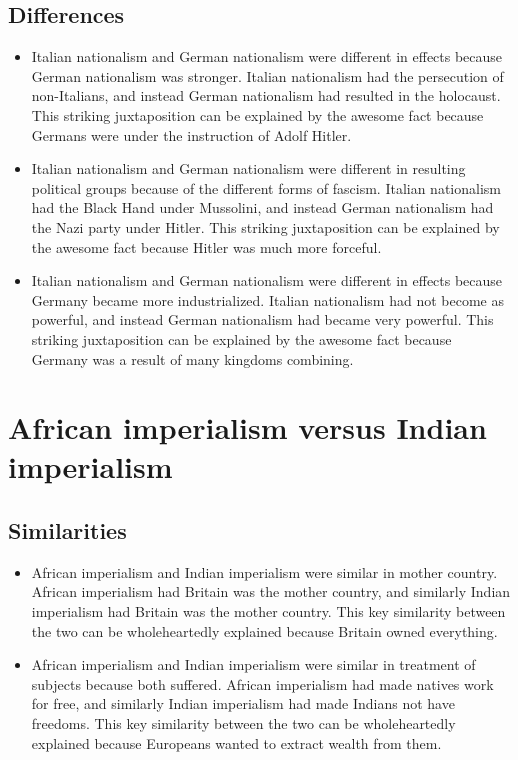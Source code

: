 \documentclass[letterpaper, 10pt]{article}
\begin{document}
            \subsection{Differences}
                \begin{itemize}
                    \item Italian nationalism and German nationalism were different in effects because German nationalism was stronger. Italian nationalism had the persecution of non-Italians, and instead German nationalism had resulted in the holocaust. This striking juxtaposition can be explained by the awesome fact because Germans were under the instruction of Adolf Hitler.
                    \item Italian nationalism and German nationalism were different in resulting political groups because of the different forms of fascism. Italian nationalism had the Black Hand under Mussolini, and instead German nationalism had the Nazi party under Hitler. This striking juxtaposition can be explained by the awesome fact because Hitler was much more forceful.
                    \item Italian nationalism and German nationalism were different in effects because Germany became more industrialized. Italian nationalism had not become as powerful, and instead German nationalism had became very powerful. This striking juxtaposition can be explained by the awesome fact because Germany was a result of many kingdoms combining.
                \end{itemize}
        \section{African imperialism versus Indian imperialism}
            \subsection{Similarities}
                \begin{itemize}
                    \item African imperialism and Indian imperialism were similar in mother country. African imperialism had Britain was the mother country, and similarly Indian imperialism had Britain was the mother country. This key similarity between the two can be wholeheartedly explained because Britain owned everything.
                    \item African imperialism and Indian imperialism were similar in treatment of subjects because both suffered. African imperialism had made natives work for free, and similarly Indian imperialism had made Indians not have freedoms. This key similarity between the two can be wholeheartedly explained because Europeans wanted to extract wealth from them.
                \end{itemize}
\end{document}
